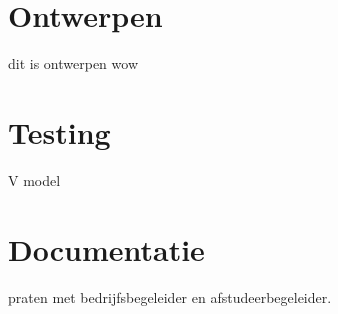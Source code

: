\section{Ontwerpen}
dit is ontwerpen wow
\section{Testing}
\label{sec:Testing}
V model
\section{Documentatie}
praten met bedrijfsbegeleider en afstudeerbegeleider.
